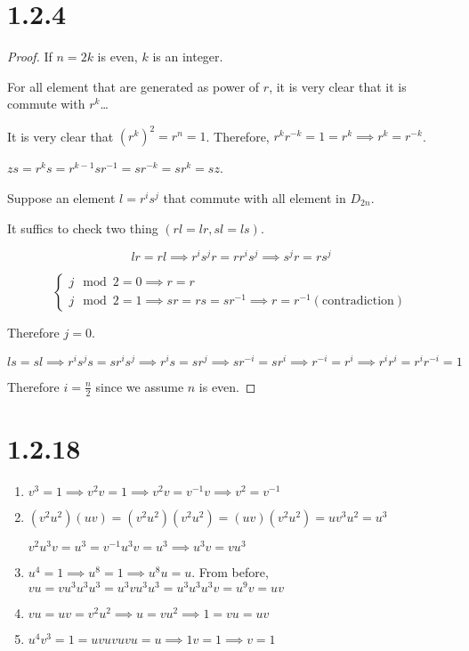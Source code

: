 \documentclass[11pt]{article}
\begin{document}
\section*{1.2.4}

\begin{proof}
	If $n=2k$ is even, $k$ is an integer. 

	For all element that are generated as power of $r$, it is very clear that it is commute with $r^k$\dots

	It is very clear that $(r^k)^2=r^n=1$. Therefore, $r^kr^{-k}=1=r^k \implies r^k=r^{-k}$.

	$zs=r^ks=r^{k-1}sr^{-1}=sr^{-k}=sr^k=sz$.

	Suppose an element $l=r^is^j$ that commute with all element in $D_{2n}$.

	It suffics to check two thing $(rl=lr, sl=ls)$.

	$$
	lr=rl \implies r^is^jr = rr^is^j \implies s^jr = rs^j
	$$

	$$
	\begin{cases}
		j \mod 2 = 0 \implies r = r \\ 
		j \mod 2 = 1 \implies sr = rs = sr^{-1} \implies r = r^{-1} (\text{contradiction})
	\end{cases}
	$$

	Therefore $j=0$.

	$$
	ls=sl \implies r^i s^j s = s r^i s^j \implies r^i s = s r^j \implies sr^{-i} = sr^{i} \implies r^{-i} = r^{i} \implies r^i r^i = r^i r^{-i} = 1
	$$

	Therefore $i=\frac{n}{2}$ since we assume $n$ is even.

\end{proof}

\section*{1.2.18}

\begin{enumerate}
	\item $v^3=1 \implies v^2 v = 1 \implies v^2 v = v^{-1} v \implies v^2 = v^{-1}$
	\item $(v^2 u^2) (uv) = (v^2 u^2) (v^2 u^2) = (uv) (v^2 u^2) = u v^3 u^2 = u^3$
	
		$v^2u^3v = u^3 = v^{-1} u^3 v = u^3 \implies u^3 v = v u^3$
	\item $u^4 = 1 \implies u^8 = 1 \implies u^8 u = u$. From before, $vu = v u^3 u^3 u^3 = u^3 v u^3 u^3 = u^3 u^3 u^3 v = u^9 v = uv$
	\item $vu = uv = v^2u^2 \implies u = vu^2 \implies 1 = vu = uv$
	\item $u^4v^3 = 1 = uv uv uv u = u \implies 1v=1 \implies v=1$
\end{enumerate}
\end{document}
